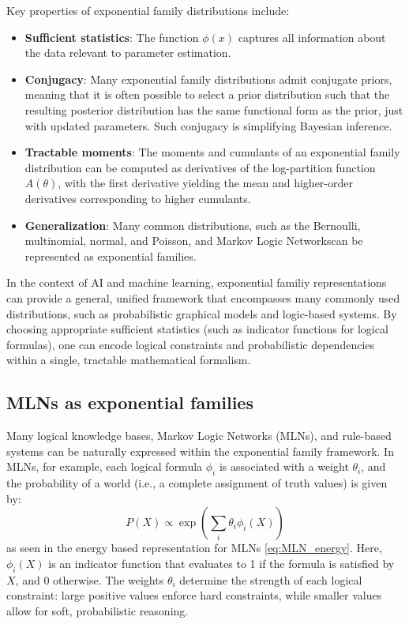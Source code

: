 \documentclass[encoding=utf8,british]{tumphthesis}
\begin{document}
            Key properties of exponential family distributions include:
            
            \begin{itemize}
                \item \textbf{Sufficient statistics}: The function $\phi(x)$ captures all information about the data relevant to 
                parameter estimation.
                \item \textbf{Conjugacy}: Many exponential family distributions admit conjugate priors, meaning that it is often possible 
                to select a prior distribution such that the resulting posterior distribution has the same functional form as the prior, 
                just with updated parameters. Such conjugacy is simplifying Bayesian inference.
                \item \textbf{Tractable moments}: The moments and cumulants of an exponential family distribution can be computed 
                as derivatives of the log-partition function $A(\theta)$, with the first derivative yielding the mean and higher-order 
                derivatives corresponding to higher cumulants.
                \item \textbf{Generalization}: Many common distributions, such as the Bernoulli, multinomial, normal, and Poisson, 
                and Markov Logic Networkscan be represented as exponential families.
            \end{itemize}

            In the context of AI and machine learning, exponential familiy representations can provide a general, 
            unified framework that encompasses many commonly used distributions, such as probabilistic graphical models and logic-based systems. 
            By choosing appropriate sufficient statistics (such as indicator functions for logical formulas), 
            one can encode logical constraints and probabilistic dependencies within a single, tractable mathematical formalism.

        \subsection{MLNs as exponential families}
        \label{subsect:Foundations_ExpFam_MLN}
            Many logical knowledge bases, Markov Logic Networks (MLNs), and rule-based systems can be naturally expressed within the 
            exponential family framework. In MLNs, for example, each logical formula $\phi_i$ is associated with a weight $\theta_i$, 
            and the probability of a world (i.e., a complete assignment of truth values) is given by:
            \begin{equation}
                P(X) \propto \exp\left( \sum_i \theta_i \phi_i(X) \right)
            \end{equation}
            as seen in the energy based representation for MLNs \ref{eq:MLN_energy}. Here, $\phi_i(X)$ is an indicator function that evaluates to 1 if the formula is satisfied by $X$, and 0 otherwise. The 
            weights $\theta_i$ determine the strength of each logical constraint: large positive values enforce hard constraints, 
            while smaller values allow for soft, probabilistic reasoning.
\end{document}
